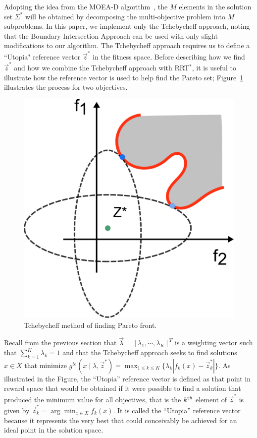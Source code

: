 \documentclass{article}
\begin{document}
Adopting the idea from the MOEA-D algorithm~\cite{4358754}, the $M$ elements in the solution set $\Sigma^{*}$ will be obtained by decomposing the multi-objective problem into $ M $ subproblems.  
In this paper, we implement only the Tchebycheff approach, noting that the Boundary Intersection Approach can be used with only slight modifications to our algorithm. The Tchebycheff approach requires us to define a ``Utopia" reference vector $ \vec{z}^{*} $ in the fitness space. 
Before describing how we find $ \vec{z}^{*} $ and how we combine the Tchebycheff approach with RRT$^{*}$, it is useful to illustrate how the reference vector is used to help find the Pareto set; Figure~\ref{fig:Tchebycheff} illustrates the process for two objectives.  
\begin{figure}
\centering
\includegraphics[width=0.9\linewidth]{fig/Tchebycheff.pdf}
\caption{Tchebycheff method of finding Pareto front.}
\label{fig:Tchebycheff}
\end{figure}
Recall from the previous section that  $ \vec{\lambda} = [ \lambda_{1} , \cdots , \lambda_{K}  ]^{T} $ is a weighting vector such that $ \sum_{k=1}^{K} \lambda_{k} = 1 $ and that the Tchebycheff approach seeks to find solutions $ x\in X $ that minimize $ g^{te} (x \mid \lambda , \vec{z}^{*}) = \max_{1 \leq k \leq K}  \{ \lambda_{k} | f_{k}(x) - \vec{z}^{*}_{k}  | \} $.  
As illustrated in the Figure, the ``Utopia'' reference vector is defined as that point in reward space that would be obtained if it were possible to find a solution that produced the minimum value for all objectives, that is the $k^{\rm th}$ element of $\vec{z}^*$ is given by $\vec{z}^{*}_{k} = \arg \min_{x \in X} f_{k}(x)$.  
It is called the ``Utopia'' reference vector because it represents the very best that could conceivably be achieved for an ideal point in the solution space.
\end{document}
